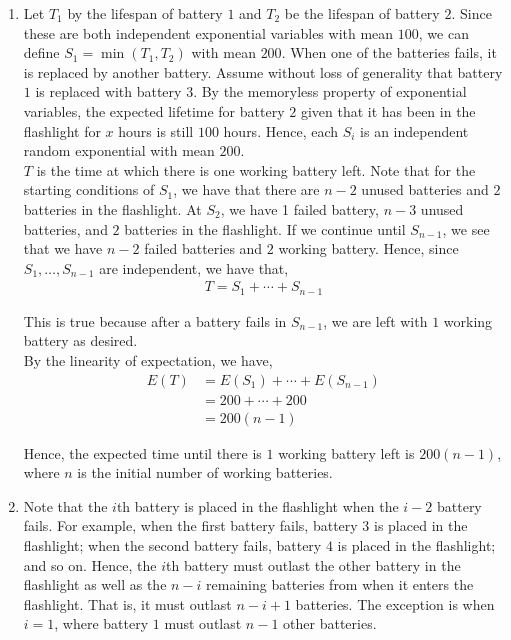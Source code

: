\documentclass[12pt]{article}
\begin{document}
\begin{enumerate}[label=(\alph*)]

\item Let $T_1$ by the lifespan of battery $1$ and $T_2$ be the lifespan of battery $2$. Since these are both independent exponential variables with mean $100$, we can define $S_1 = \min(T_1, T_2)$ with mean $200$. When one of the batteries fails, it is replaced by another battery. Assume without loss of generality that battery $1$ is replaced with battery $3$. By the memoryless property of exponential variables, the expected lifetime for battery $2$ given that it has been in the flashlight for $x$ hours is still $100$ hours. Hence, each $S_i$ is an independent random exponential with mean $200$.\\

$T$ is the time at which there is one working battery left. Note that for the starting conditions of $S_1$, we have that there are $n-2$ unused batteries and $2$ batteries in the flashlight. At $S_2$, we have 1 failed battery, $n-3$ unused batteries, and $2$ batteries in the flashlight. If we continue until $S_{n-1}$, we see that we have $n-2$ failed batteries and $2$ working battery. Hence, since $S_1, \ldots, S_{n-1}$ are independent, we have that,
\begin{align*}
T = S_1 + \cdots + S_{n-1}
\end{align*}

This is true because after a battery fails in $S_{n-1}$, we are left with $1$ working battery as desired.\\

By the linearity of expectation, we have,
\begin{align*}
E(T) &= E(S_1) + \cdots + E(S_{n-1})\\
&= 200 + \cdots + 200\\
&= 200(n-1)
\end{align*}

Hence, the expected time until there is $1$ working battery left is $200(n-1)$, where $n$ is the initial number of working batteries.

\item Note that the $i$th battery is placed in the flashlight when the $i - 2$ battery fails. For example, when the first battery fails, battery $3$ is placed in the flashlight; when the second battery fails, battery $4$ is placed in the flashlight; and so on. Hence, the $i$th battery must outlast the other battery in the flashlight as well as the $n - i$ remaining batteries from when it enters the flashlight. That is, it must outlast $n - i + 1$ batteries. The exception is when $i = 1$, where battery $1$ must outlast $n-1$ other batteries.\\


\end{enumerate}
\end{document}
